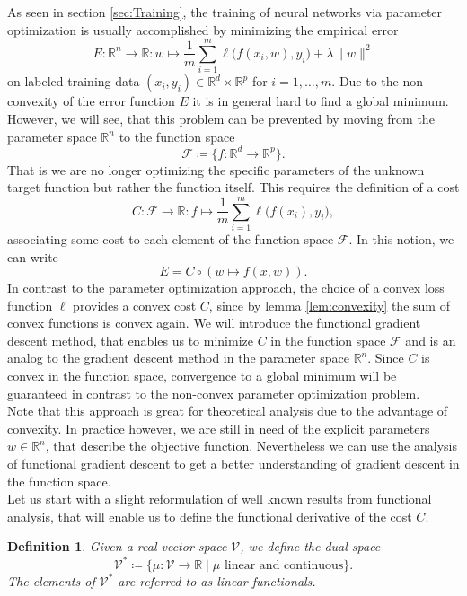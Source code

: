 \documentclass[11pt, a4paper]{article}
\newtheorem{definition}[theorem]{Definition}
\newcommand{\R}{\mathbb{R}}
\newcommand{\F}{\mathcal{F}}
\begin{document}
As seen in section \ref{sec:Training}, the training of neural networks via parameter optimization is usually accomplished by minimizing the empirical error
\[ E : \R^n \to \R : w \mapsto \frac{1}{m} \sum_{i=1}^{m} \ell \big ( f(x_i,w),y_i \big) + \lambda \| w \|^2 \]
on labeled training data $(x_i,y_i) \in \R^d \times \R^p$ for $i=1, \dots, m$. Due to the non-convexity of the error function $E$ it is in general hard to find a global minimum. However, we will see, that this problem can be prevented by moving from the parameter space $\R^n$ to the function space
\[ \F \coloneq \Big \{ f: \R^d \to \R^p \Big \}. \]
That is we are no longer optimizing the specific parameters of the unknown target function but rather the function itself. This requires the definition of a cost
\[ C: \F \to \R : f \mapsto \frac{1}{m} \sum_{i=1}^{m} \ell \big ( f(x_i),y_i \big), \]
associating some cost to each element of the function space $\F$.  In this notion, we can write
\[ E = C \circ (w \mapsto f(x,w)). \]
In contrast to the parameter optimization approach, the choice of a convex loss function $\ell$ provides a convex cost $C$, since by lemma \ref{lem:convexity} the sum of convex functions is convex again. We will introduce the functional gradient descent method, that enables us to minimize $C$ in the function space $\F$ and is an analog to the gradient descent method in the parameter space $\R^n$. Since $C$ is convex in the function space, convergence to a global minimum will be guaranteed in contrast to the non-convex parameter optimization problem. \\

Note that this approach is great for theoretical analysis due to the advantage of convexity. In practice however, we are still in need of the explicit parameters $w \in \R^n$, that describe the objective function. Nevertheless we can use the analysis of functional gradient descent to get a better understanding of gradient descent in the function space. \\

Let us start with a slight reformulation of well known results from functional analysis, that will enable us to define the functional derivative of the cost $C$.

\begin{definition}
Given a real vector space $\mathcal{V}$, we define the dual space
\[ \mathcal{V}^* \coloneq \Big \{ \mu : \mathcal{V} \to \R \mid \mu \text{ linear and continuous} \Big \}. \]
The elements of $\mathcal{V}^*$ are referred to as linear functionals.
\end{definition}
\end{document}

